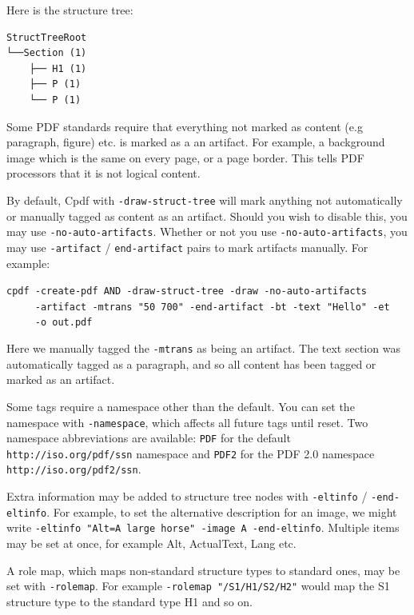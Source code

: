 \documentclass{book}
\begin{document}
\noindent Here is the structure tree:

\begin{verbatim}
StructTreeRoot
└──Section (1)
    ├── H1 (1)
    ├── P (1)
    └── P (1)
\end{verbatim}

\noindent Some PDF standards require that everything not marked as content (e.g paragraph, figure) etc. is marked as a an artifact. For example, a background image which is the same on every page, or a page border. This tells PDF processors that it is not logical content.

By default, Cpdf with \texttt{-draw-struct-tree} will mark anything not automatically or manually tagged as content as an artifact. Should you wish to disable this, you may use \texttt{-no-auto-artifacts}. Whether or not you use \texttt{-no-auto-artifacts}, you may use \texttt{-artifact} / \texttt{end-artifact} pairs to mark artifacts manually. For example:

\begin{framed}
   \noindent\small\verb!cpdf -create-pdf AND -draw-struct-tree -draw -no-auto-artifacts!\\
   \noindent\small\verb!     -artifact -mtrans "50 700" -end-artifact -bt -text "Hello" -et!\\
   \noindent\small\verb!     -o out.pdf!
\end{framed}

\noindent Here we manually tagged the \texttt{-mtrans} as being an artifact. The text section was automatically tagged as a paragraph, and so all content has been tagged or marked as an artifact.

Some tags require a namespace other than the default. You can set the namespace with \texttt{-namespace}, which affects all future tags until reset. Two namespace abbreviations are available: \texttt{PDF} for the default \texttt{http://iso.org/pdf/ssn} namespace and \texttt{PDF2} for the PDF 2.0 namespace \texttt{http://iso.org/pdf2/ssn}.

Extra information may be added to structure tree nodes with \texttt{-eltinfo} / \texttt{-end-eltinfo}. For example, to set the alternative description for an image, we might write \texttt{-eltinfo "Alt=A large horse" -image A -end-eltinfo}. Multiple items may be set at once, for example Alt, ActualText, Lang etc. 

A role map, which maps non-standard structure types to standard ones, may be set with \texttt{-rolemap}. For example \texttt{-rolemap "/S1/H1/S2/H2"} would map the S1 structure type to the standard type H1 and so on.
\end{document}
